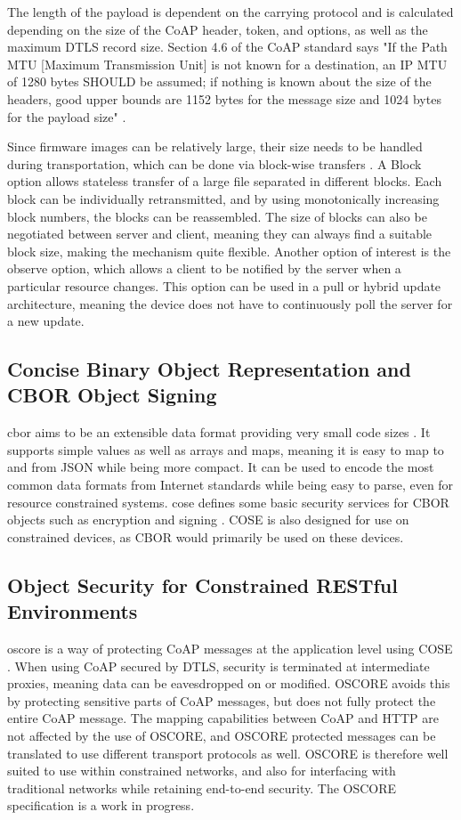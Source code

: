 \documentclass[0-thesis.tex]{subfiles}
\begin{document}
The length of the payload is dependent on the carrying protocol and is calculated
depending on the size of the CoAP header, token, and options, as well as the maximum DTLS
record size. Section 4.6 of the CoAP standard says "If the Path MTU [Maximum Transmission
Unit] is not known for a destination, an IP MTU of 1280 bytes SHOULD be assumed; if
nothing is known about the size of the headers, good upper bounds are 1152 bytes for the
message size and 1024 bytes for the payload size" \parencite{rfc7252}.

Since firmware images can be relatively large, their size needs to be handled during
transportation, which can be done via block-wise transfers \parencite{rfc7959}. A Block
option allows stateless transfer of a large file separated in different blocks. Each block
can be individually retransmitted, and by using monotonically increasing block numbers, the
blocks can be reassembled. The size of blocks can also be negotiated between server and
client, meaning they can always find a suitable block size, making the mechanism quite
flexible. Another option of interest is the observe option, which allows a client to be
notified by the server when a particular resource changes. This option can be used in a
pull or hybrid update architecture, meaning the device does not have to continuously poll
the server for a new update.

\subsection{Concise Binary Object Representation and CBOR Object Signing}
\label{ssec:cbor-and-cose}
\gls{cbor} aims to be an extensible data format providing very small code sizes
\parencite{rfc7049}. It supports simple values as well as arrays and maps, meaning it is
easy to map to and from JSON while being more compact. It can be used to encode the most
common data formats from Internet standards while being easy to parse, even for resource
constrained systems. \gls{cose} defines some basic security services for CBOR objects such
as encryption and signing \parencite{rfc8152}. COSE is also designed for use on
constrained devices, as CBOR would primarily be used on these devices.

\subsection{Object Security for Constrained RESTful Environments}
\label{ssec:oscore}
\gls{oscore} is a way of protecting CoAP messages at the application level using COSE
\parencite{oscore}. When using CoAP secured by DTLS, security is terminated at
intermediate proxies, meaning data can be eavesdropped on or modified. OSCORE avoids this
by protecting sensitive parts of CoAP messages, but does not fully protect the entire CoAP
message. The mapping capabilities between CoAP and HTTP are not affected by the use of
OSCORE, and OSCORE protected messages can be translated to use different transport
protocols as well. OSCORE is therefore well suited to use within constrained networks, and
also for interfacing with traditional networks while retaining end-to-end security. The
OSCORE specification is a work in progress.
\end{document}
